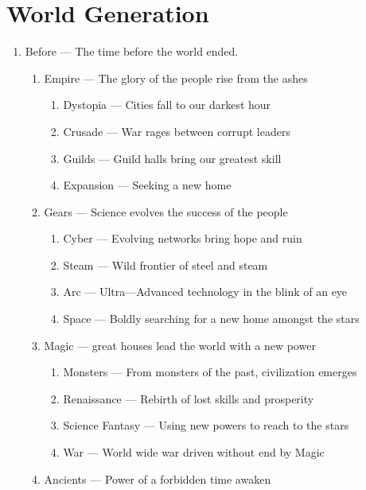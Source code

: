 \chapter{World Generation}
\begin{enumerate}
\item Before --- The time before the world ended.  
	\begin{enumerate}
	\item Empire --- The glory of the people rise from the ashes
		\begin{enumerate}
		\item Dystopia --- Cities fall to our darkest hour
		\item Crusade --- War rages between corrupt leaders
		\item Guilds --- Guild halls bring our greatest skill
		\item Expansion --- Seeking a new home
		\end{enumerate}
	\item Gears --- Science evolves the success of the people
		\begin{enumerate}
		\item Cyber --- Evolving networks bring hope and ruin
		\item Steam --- Wild frontier of steel and steam
		\item Arc --- Ultra---Advanced technology in the blink of an eye
		\item Space --- Boldly searching for a new home amongst the stars
		\end{enumerate}
	\item Magic --- great houses lead the world with a new power
		\begin{enumerate}
		\item Monsters --- From monsters of the past, civilization emerges
		\item Renaissance --- Rebirth of lost skills and prosperity
		\item Science Fantasy --- Using new powers to reach to the stars
		\item War --- World wide war driven without end by Magic
		\end{enumerate}
	\item Ancients --- Power of a forbidden time awaken

\end{enumerate}
\end{enumerate}
